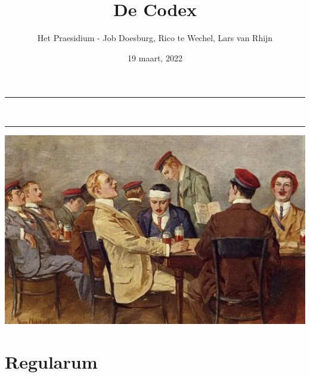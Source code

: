 \documentclass[10pt]{article}
\title{De Codex}
\date{{19 maart, 2022}}
\author{Het Praesidium - Job Doesburg, Rico te Wechel, Lars van Rhijn} %
\begin{document}
\begin{titlepage}
\centering
\vspace*{0.5cm}
\hrule
\vspace{0.4cm}
{\LARGE \textsc{\thetitle}}\\[0.4cm]
\vspace{0.4cm}
\hrule
\vspace{15mm}

\includegraphics[scale=0.5]{image.jpg}  %

\vfill
\vspace{1.5cm}
{\Large \thedate}
\vspace{2cm}
\end{titlepage}
\thispagestyle{empty}

\newpage
\vspace{1cm}
\setcounter{secnumdepth}{-1}
\tableofcontents
\renewcommand{\baselinestretch}{1.0}\normalsize
\newpage

\section{Regularum}
\footnotesize

\vspace{1cm}
\end{document}
